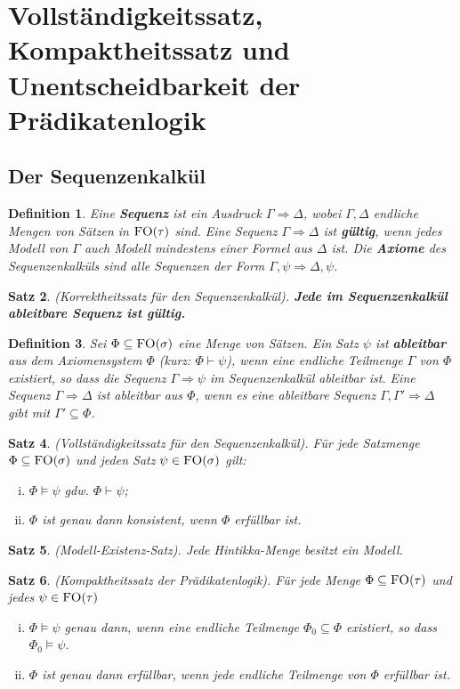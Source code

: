 \documentclass[12pt,a4paper]{article}
\newtheorem{defi}{Definition}[section]
\newtheorem{satz}[defi]{Satz}
\begin{document}
\section{Vollständigkeitssatz, Kompaktheitssatz und Unentscheidbarkeit der Prädikatenlogik}
\subsection{Der Sequenzenkalkül}
	\begin{defi}
		Eine \textbf{Sequenz} ist ein Ausdruck $\Gamma\Rightarrow\Delta$, wobei $\Gamma,\Delta$ endliche Mengen von Sätzen in $\textsc{FO}(\tau)$ sind. Eine Sequenz $\Gamma\Rightarrow\Delta$ ist \textbf{gültig}, wenn jedes Modell von $\Gamma$ auch Modell mindestens einer Formel aus $\Delta$ ist. Die \textbf{Axiome} des Sequenzenkalküls sind alle Sequenzen der Form $\Gamma,\psi\Rightarrow\Delta,\psi$.
	\end{defi}
	\begin{satz}
		(Korrektheitssatz für den Sequenzenkalkül). \textbf{Jede im Sequenzenkalkül ableitbare Sequenz ist gültig.}
	\end{satz}
	\begin{defi}
		Sei $\Phi\subseteq\textsc{FO}(\sigma)$ eine Menge von Sätzen. Ein Satz $\psi$ ist \textbf{ableitbar} aus dem Axiomensystem $\Phi$ (kurz: $\Phi\vdash\psi$), wenn eine endliche Teilmenge $\Gamma$ von $\Phi$ existiert, so dass die Sequenz $\Gamma\Rightarrow\psi$ im Sequenzenkalkül ableitbar ist. Eine Sequenz $\Gamma\Rightarrow\Delta$ ist ableitbar aus $\Phi$, wenn es eine ableitbare Sequenz $\Gamma,\Gamma'\Rightarrow\Delta$ gibt mit $\Gamma'\subseteq\Phi$.
	\end{defi}
	\begin{satz}
		(Vollständigkeitssatz für den Sequenzenkalkül). Für jede Satzmenge $\Phi\subseteq\textsc{FO}(\sigma)$ und jeden Satz $\psi\in\textsc{FO}(\sigma)$ gilt:
		\begin{enumerate}[(i)]
			\item $\Phi\models\psi$ gdw. $\Phi\vdash\psi$;
			\item $\Phi$ ist genau dann konsistent, wenn $\Phi$ erfüllbar ist.
		\end{enumerate}
	\end{satz}
	\begin{satz}
		(Modell-Existenz-Satz). Jede Hintikka-Menge besitzt ein Modell.
	\end{satz}
	\begin{satz}
		(Kompaktheitssatz der Prädikatenlogik). Für jede Menge $\Phi\subseteq\textsc{FO}(\tau)$ und jedes $\psi\in\textsc{FO}(\tau)$
		\begin{enumerate}[(i)]
			\item $\Phi\models\psi$ genau dann, wenn eine endliche Teilmenge $\Phi_0\subseteq\Phi$ existiert, so dass $\Phi_0\models\psi$.
			\item $\Phi$ ist genau dann erfüllbar, wenn jede endliche Teilmenge von $\Phi$ erfüllbar ist.
		\end{enumerate}
	\end{satz}
\end{document}
